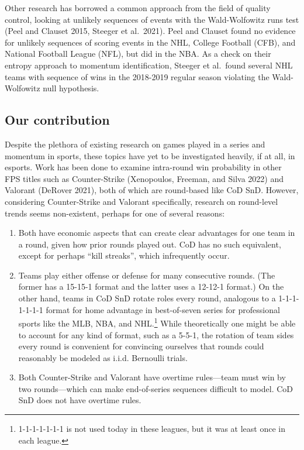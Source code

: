 \documentclass{article}
\providecommand{\tightlist}{%
  \setlength{\itemsep}{0pt}\setlength{\parskip}{0pt}}
\begin{document}
Other research has borrowed a common approach from the field of quality
control, looking at unlikely sequences of events with the Wald-Wolfowitz
runs test (Peel and Clauset 2015, Steeger et al.~2021). Peel and Clauset
found no evidence for unlikely sequences of scoring events in the NHL,
College Football (CFB), and National Football League (NFL), but did in
the NBA. As a check on their entropy approach to momentum
identification, Steeger et al.~found several NHL teams with sequence of
wins in the 2018-2019 regular season violating the Wald-Wolfowitz null
hypothesis.

\hypertarget{our-contribution}{%
\subsection{Our contribution}\label{our-contribution}}

Despite the plethora of existing research on games played in a series
and momentum in sports, these topics have yet to be investigated
heavily, if at all, in esports. Work has been done to examine
intra-round win probability in other FPS titles such as Counter-Strike
(Xenopoulos, Freeman, and Silva 2022) and Valorant (DeRover 2021), both
of which are round-based like CoD SnD. However, considering
Counter-Strike and Valorant specifically, research on round-level trends
seems non-existent, perhaps for one of several reasons:

\begin{enumerate}
\def\labelenumi{\arabic{enumi}.}
\tightlist
\item
  Both have economic aspects that can create clear advantages for one
  team in a round, given how prior rounds played out. CoD has no such
  equivalent, except for perhaps ``kill streaks'', which infrequently
  occur.
\item
  Teams play either offense or defense for many consecutive rounds. (The
  former has a 15-15-1 format and the latter uses a 12-12-1 format.) On
  the other hand, teams in CoD SnD rotate roles every round, analogous
  to a 1-1-1-1-1-1-1 format for home advantage in best-of-seven series
  for professional sports like the MLB, NBA, and NHL.\footnote{1-1-1-1-1-1-1
    is not used today in these leagues, but it was at least once in each
    league.} While theoretically one might be able to account for any
  kind of format, such as a 5-5-1, the rotation of team sides every
  round is convenient for convincing ourselves that rounds could
  reasonably be modeled as i.i.d. Bernoulli trials.
\item
  Both Counter-Strike and Valorant have overtime rules---team must win
  by two rounds---which can make end-of-series sequences difficult to
  model. CoD SnD does not have overtime rules.
\end{enumerate}
\end{document}

